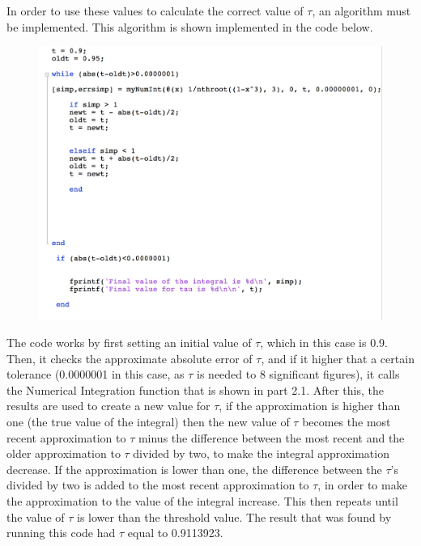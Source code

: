 \documentclass[a4paper]{article}
\begin{document}

In order to use these values to calculate the correct value of $\tau$, an algorithm must be implemented. This algorithm is shown implemented in the code below.



\begin{figure}[H]
\includegraphics[width=1\textwidth]{codetofindtau.jpg}
\end{figure}

The code works by first setting an initial value of $\tau$, which in this case is 0.9. Then, it checks the approximate absolute error of $\tau$, and if it higher that a certain tolerance (0.0000001 in this case, as $\tau$ is needed to 8 significant figures), it calls the Numerical Integration function that is shown in part 2.1. \newline \newline
After this, the results are used to create a new value for $\tau$, if the approximation is higher than one (the true value of the integral) then the new value of $\tau$ becomes the most recent approximation to $\tau$ minus the difference between the most recent and the older approximation to $\tau$ divided by two, to make the integral approximation decrease. If the approximation is lower than one, the difference between the $\tau$'s divided by two is added to the most recent approximation to $\tau$, in order to make the approximation to the value of the integral increase. This then repeats until the value of $\tau$ is lower than the threshold value.\newline \newline
The result that was found by running this code had $\tau$ equal to 0.9113923. 
\end{document}
